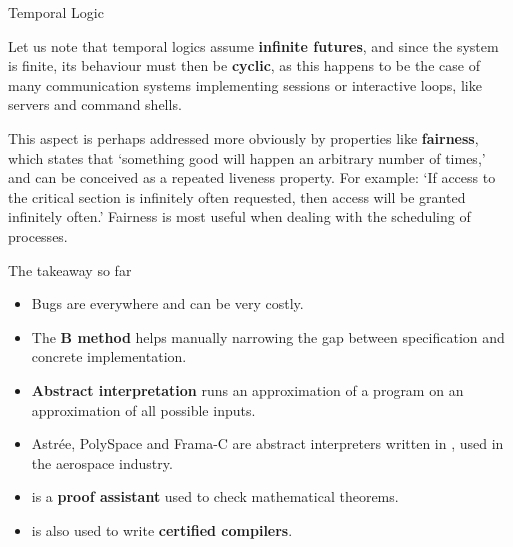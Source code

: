 \documentclass[compress,dvipdfmx]{beamer}
\begin{document}
\begin{frame}{Temporal Logic}

  Let us note that temporal logics assume \textbf{infinite futures},
  and since the system is finite, its behaviour must then be
  \textbf{cyclic}, as this happens to be the case of many
  communication systems implementing sessions or interactive loops,
  like servers and command shells.

  \bigskip

  This aspect is perhaps addressed more obviously by properties like
  \textbf{fairness}, which states that `something good will happen an
  arbitrary number of times,' and can be conceived as a repeated
  liveness property. For example: `If access to the critical section
  is infinitely often requested, then access will be granted
  infinitely often.' Fairness is most useful when dealing with the
  scheduling of processes.

\end{frame}

\begin{frame}{The takeaway so far}

  \begin{itemize}

    \item Bugs are everywhere and can be very costly.

    \item The \textbf{B method} helps manually narrowing the gap
      between specification and concrete implementation.

    \item \textbf{Abstract interpretation} runs an approximation of a
      program on an approximation of all possible inputs.

    \item Astrée, PolySpace and Frama-C are abstract interpreters
      written in \OCaml, used in the aerospace industry.

    \item \Coq is a \textbf{proof assistant} used to check
      mathematical theorems.

    \item \Coq is also used to write \textbf{certified compilers}.

  \end{itemize}

\end{frame}
\end{document}
